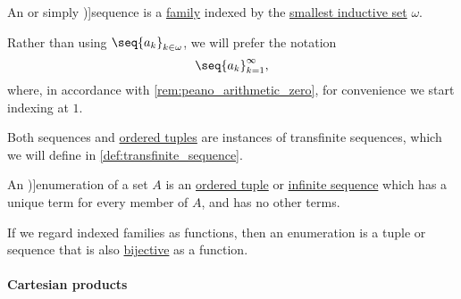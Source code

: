 \begin{definition}\label{def:sequence}
  An  or simply \term[ru=последовательность (\cite[10]{Архангельский1988КанторовскаяТеорияМножеств})]{sequence} is a \hyperref[def:indexed_family]{family} indexed by the \hyperref[thm:smallest_inductive_set_existence]{smallest inductive set} \( \omega \).

  Rather than using \( \seq{ a_k }_{k \in \omega} \), we will prefer the notation
  \begin{equation*}
    \seq{ a_k }_{k=1}^\infty,
  \end{equation*}
  where, in accordance with \cref{rem:peano_arithmetic_zero}, for convenience we start indexing at \( 1 \).
\end{definition}
\begin{comments}
  \item Both sequences and \hyperref[def:ordered_tuple]{ordered tuples} are instances of transfinite sequences, which we will define in \cref{def:transfinite_sequence}.
\end{comments}

\begin{definition}\label{def:enumeration}\mimprovised
  An \term[en=enumeration (\cite[190]{Kleene2002Logic})]{enumeration} of a set \( A \) is an \hyperref[def:ordered_tuple]{ordered tuple} or \hyperref[def:sequence]{infinite sequence} which has a unique term for every member of \( A \), and has no other terms.
\end{definition}
\begin{comments}
  \item If we regard indexed families as functions, then an enumeration is a tuple or sequence that is also \hyperref[def:function_invertibility/bijective]{bijective} as a function.
\end{comments}

\paragraph{Cartesian products}

